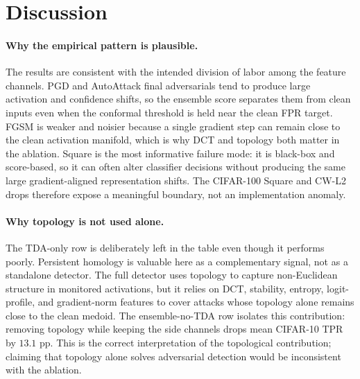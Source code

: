 \documentclass{article}
\begin{document}
\section{Discussion}
\paragraph{Why the empirical pattern is plausible.}
The results are consistent with the intended division of labor among the feature channels. PGD and AutoAttack final adversarials tend to produce large activation and confidence shifts, so the ensemble score separates them from clean inputs even when the conformal threshold is held near the clean FPR target. FGSM is weaker and noisier because a single gradient step can remain close to the clean activation manifold, which is why DCT and topology both matter in the ablation. Square is the most informative failure mode: it is black-box and score-based, so it can often alter classifier decisions without producing the same large gradient-aligned representation shifts. The CIFAR-100 Square and CW-L2 drops therefore expose a meaningful boundary, not an implementation anomaly.

\paragraph{Why topology is not used alone.}
The TDA-only row is deliberately left in the table even though it performs poorly. Persistent homology is valuable here as a complementary signal, not as a standalone detector. The full detector uses topology to capture non-Euclidean structure in monitored activations, but it relies on DCT, stability, entropy, logit-profile, and gradient-norm features to cover attacks whose topology alone remains close to the clean medoid. The ensemble-no-TDA row isolates this contribution: removing topology while keeping the side channels drops mean CIFAR-10 TPR by $13.1$ pp. This is the correct interpretation of the topological contribution; claiming that topology alone solves adversarial detection would be inconsistent with the ablation.
\end{document}
